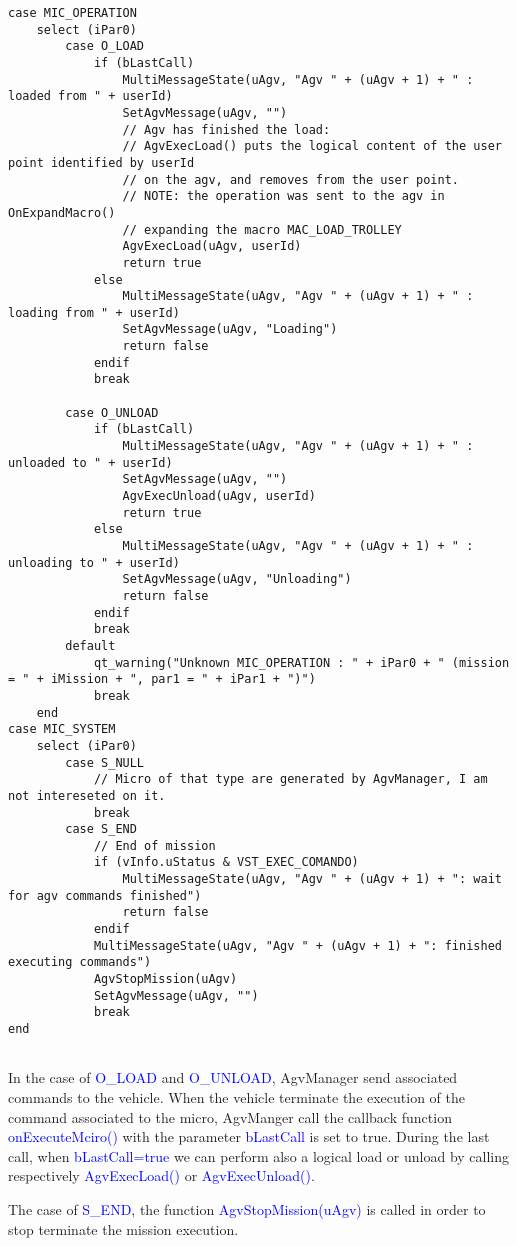 \begin{lstlisting}
case MIC_OPERATION
	select (iPar0)
		case O_LOAD
			if (bLastCall)
				MultiMessageState(uAgv, "Agv " + (uAgv + 1) + " : loaded from " + userId)
				SetAgvMessage(uAgv, "")
				// Agv has finished the load:
				// AgvExecLoad() puts the logical content of the user point identified by userId
				// on the agv, and removes from the user point.
				// NOTE: the operation was sent to the agv in OnExpandMacro()
				// expanding the macro MAC_LOAD_TROLLEY
				AgvExecLoad(uAgv, userId)
				return true
			else
				MultiMessageState(uAgv, "Agv " + (uAgv + 1) + " : loading from " + userId)
				SetAgvMessage(uAgv, "Loading")
				return false
			endif
			break
	
		case O_UNLOAD
			if (bLastCall)
				MultiMessageState(uAgv, "Agv " + (uAgv + 1) + " : unloaded to " + userId)
				SetAgvMessage(uAgv, "")
				AgvExecUnload(uAgv, userId)
				return true
			else
				MultiMessageState(uAgv, "Agv " + (uAgv + 1) + " : unloading to " + userId)
				SetAgvMessage(uAgv, "Unloading")
				return false
			endif
			break
		default
			qt_warning("Unknown MIC_OPERATION : " + iPar0 + " (mission = " + iMission + ", par1 = " + iPar1 + ")")
			break
	end
case MIC_SYSTEM
	select (iPar0)
		case S_NULL
			// Micro of that type are generated by AgvManager, I am not intereseted on it.
			break
		case S_END
			// End of mission
			if (vInfo.uStatus & VST_EXEC_COMANDO)
				MultiMessageState(uAgv, "Agv " + (uAgv + 1) + ": wait for agv commands finished")
				return false
			endif
			MultiMessageState(uAgv, "Agv " + (uAgv + 1) + ": finished executing commands")
			AgvStopMission(uAgv)
			SetAgvMessage(uAgv, "")
			break
end
	
\end{lstlisting}

In the case of \textcolor{blue}{O\_LOAD} and \textcolor{blue}{O\_UNLOAD}, AgvManager send associated commands to the vehicle. When the vehicle terminate the execution of the command associated to the micro, AgvManger call the callback function \textcolor{blue}{onExecuteMciro()} with the parameter \textcolor{blue}{bLastCall} is set to true. During the last call, when \textcolor{blue}{bLastCall=true} we can perform also a logical load or unload by calling respectively \textcolor{blue}{AgvExecLoad()} or \textcolor{blue}{AgvExecUnload()}.

The case of \textcolor{blue}{S\_END}, the function \textcolor{blue}{AgvStopMission(uAgv)} is called in order to stop terminate the mission execution.

